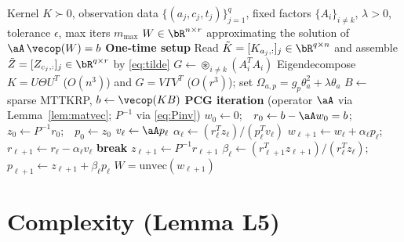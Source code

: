 \begin{algorithm}[h]
\caption{Preconditioned CG (PCG) for the mode-$k$ subproblem}
\label{alg:pcg}
\begin{algorithmic}[1]
\Require Kernel $K\succ0$, observation data $\{(a_j,c_j,t_j)\}_{j=1}^q$, fixed
  factors $\{A_i\}_{i\neq k}$, $\lambda>0$, tolerance $\epsilon$, max iters $m_{\max}$
\Ensure $W\in\bR^{n\times r}$ approximating the solution of $\aA\,\vecop(W)=b$
\Statex \textbf{One-time setup}
\State Read $\tilde K=[K_{a_j,:}]_j\in\bR^{q\times n}$ and assemble
  $\tilde Z=[Z_{c_j,:}]_j\in\bR^{q\times r}$ by \eqref{eq:tilde}
\State $G\gets \circledast_{i\neq k}(A_i^{T}A_i)$ 
\State Eigendecompose $K=U\Theta U^{T}$ ($O(n^3)$) and $G=V\Gamma V^{T}$ ($O(r^3)$);
  set $\Omega_{a,p}=g_p\theta_a^2+\lambda\theta_a$
\State $B\gets$ sparse MTTKRP, $b\gets\vecop(KB)$ 
\Statex \textbf{PCG iteration} (operator $\aA$ via Lemma~\ref{lem:matvec}; $P^{-1}$ via \eqref{eq:Pinv})
\State $w_0\gets 0$;\ \ $r_0\gets b-\aA w_0=b$;\ \ $z_0\gets P^{-1}r_0$;\ \ $p_0\gets z_0$
  \State $v_\ell\gets \aA p_\ell$ 
  \State $\alpha_\ell\gets (r_\ell^{T}z_\ell)/(p_\ell^{T}v_\ell)$
  \State $w_{\ell+1}\gets w_\ell+\alpha_\ell p_\ell$;\ \ $r_{\ell+1}\gets r_\ell-\alpha_\ell v_\ell$
   \textbf{break} \EndIf
  \State $z_{\ell+1}\gets P^{-1}r_{\ell+1}$ 
  \State $\beta_\ell\gets (r_{\ell+1}^{T}z_{\ell+1})/(r_\ell^{T}z_\ell)$;\ \ $p_{\ell+1}\gets z_{\ell+1}+\beta_\ell p_\ell$
\EndFor
\State \Return $W=\mathrm{unvec}(w_{\ell+1})$
\end{algorithmic}
\end{algorithm}

\section*{Complexity (Lemma L5)}

